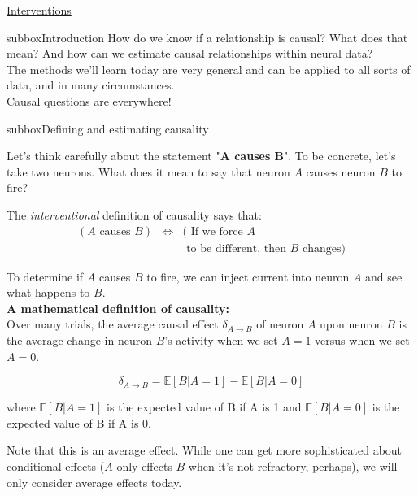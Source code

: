 \begin{textbox}{\href{https://compneuro.neuromatch.io/tutorials/W3D5_NetworkCausality/student/W3D5_Tutorial1.html}{Interventions }   }
\begin{subbox}{subbox}{Introduction}
\scriptsize
How do we know if a relationship is causal? What does that mean? And how can we estimate causal relationships within neural data?\\

The methods we'll learn today are very general and can be applied to all sorts of data, and in many circumstances.\\
Causal questions are everywhere!

\end{subbox}
\begin{subbox}{subbox}{Defining and estimating causality}
\scriptsize

Let's think carefully about the statement "\textbf{A causes B}". To be concrete, let's take two neurons. What does it mean to say that neuron $A$ causes neuron $B$ to fire?

The \textit{interventional} definition of causality says that:
\begin{eqnarray*}
(A \text{ causes } B) &\Leftrightarrow& ( \text{ If we force }A \\
& & \text { to be different, then }B\text{ changes})
\end{eqnarray*}

To determine if $A$ causes $B$ to fire, we can inject current into neuron $A$ and see what happens to $B$.\\

\textbf{A mathematical definition of causality:}\\
Over many trials, the average causal effect $\delta_{A\to B}$ of neuron $A$ upon neuron $B$ is the average change in neuron $B$'s activity when we set $A=1$ versus when we set $A=0$.


\begin{equation*}
\delta_{A\to B} = \mathbb{E}[B | A=1] -  \mathbb{E}[B | A=0] 
\end{equation*}


where $\mathbb{E}[B | A=1]$ is the expected value of B if A is 1 and  $\mathbb{E}[B | A=0]$ is the expected value of B if A is 0.

Note that this is an average effect. While one can get more sophisticated about conditional effects ($A$ only effects $B$ when it's not refractory, perhaps), we will only consider average effects today.



\end{subbox}
\end{textbox}

